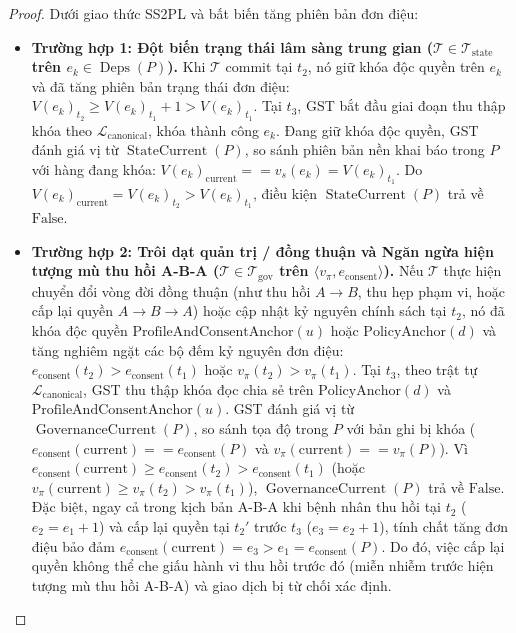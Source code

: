 \documentclass[11pt]{article}
\begin{document}
\begin{proof}
Dưới giao thức SS2PL và bất biến tăng phiên bản đơn điệu:
\begin{itemize}
    \item \textbf{Trường hợp 1: Đột biến trạng thái lâm sàng trung gian ($\mathcal{T} \in \mathcal{T}_{\text{state}}$ trên $e_k \in \operatorname{Deps}(P)$).}
    Khi $\mathcal{T}$ commit tại $t_2$, nó giữ khóa độc quyền trên $e_k$ và đã tăng phiên bản trạng thái đơn điệu: $V(e_k)_{t_2} \ge V(e_k)_{t_1} + 1 > V(e_k)_{t_1}$.
    Tại $t_3$, GST bắt đầu giai đoạn thu thập khóa theo $\mathcal{L}_{\text{canonical}}$, khóa thành công $e_k$.
    Đang giữ khóa độc quyền, GST đánh giá vị từ $\operatorname{StateCurrent}(P)$, so sánh phiên bản nền khai báo trong $P$ với hàng đang khóa: $V(e_k)_{\text{current}} == v_s(e_k) = V(e_k)_{t_1}$.
    Do $V(e_k)_{\text{current}} = V(e_k)_{t_2} > V(e_k)_{t_1}$, điều kiện $\operatorname{StateCurrent}(P)$ trả về $\text{False}$.

    \item \textbf{Trường hợp 2: Trôi dạt quản trị / đồng thuận và Ngăn ngừa hiện tượng mù thu hồi A-B-A ($\mathcal{T} \in \mathcal{T}_{\text{gov}}$ trên $\langle v_{\pi}, e_{\text{consent}} \rangle$).}
    Nếu $\mathcal{T}$ thực hiện chuyển đổi vòng đời đồng thuận (như thu hồi $A \to B$, thu hẹp phạm vi, hoặc cấp lại quyền $A \to B \to A$) hoặc cập nhật kỷ nguyên chính sách tại $t_2$, nó đã khóa độc quyền $\text{ProfileAndConsentAnchor}(u)$ hoặc $\text{PolicyAnchor}(d)$ và tăng nghiêm ngặt các bộ đếm kỷ nguyên đơn điệu: $e_{\text{consent}}(t_2) > e_{\text{consent}}(t_1)$ hoặc $v_{\pi}(t_2) > v_{\pi}(t_1)$.
    Tại $t_3$, theo trật tự $\mathcal{L}_{\text{canonical}}$, GST thu thập khóa đọc chia sẻ trên $\text{PolicyAnchor}(d)$ và $\text{ProfileAndConsentAnchor}(u)$.
    GST đánh giá vị từ $\operatorname{GovernanceCurrent}(P)$, so sánh tọa độ trong $P$ với bản ghi bị khóa ($e_{\text{consent}}(\text{current}) == e_{\text{consent}}(P)$ và $v_{\pi}(\text{current}) == v_{\pi}(P)$).
    Vì $e_{\text{consent}}(\text{current}) \ge e_{\text{consent}}(t_2) > e_{\text{consent}}(t_1)$ (hoặc $v_{\pi}(\text{current}) \ge v_{\pi}(t_2) > v_{\pi}(t_1)$), $\operatorname{GovernanceCurrent}(P)$ trả về $\text{False}$.
    Đặc biệt, ngay cả trong kịch bản A-B-A khi bệnh nhân thu hồi tại $t_2$ ($e_2 = e_1 + 1$) và cấp lại quyền tại $t_2'$ trước $t_3$ ($e_3 = e_2 + 1$), tính chất tăng đơn điệu bảo đảm $e_{\text{consent}}(\text{current}) = e_3 > e_1 = e_{\text{consent}}(P)$. Do đó, việc cấp lại quyền không thể che giấu hành vi thu hồi trước đó (miễn nhiễm trước hiện tượng mù thu hồi A-B-A) và giao dịch bị từ chối xác định.


\end{itemize}
\end{proof}
\end{document}
